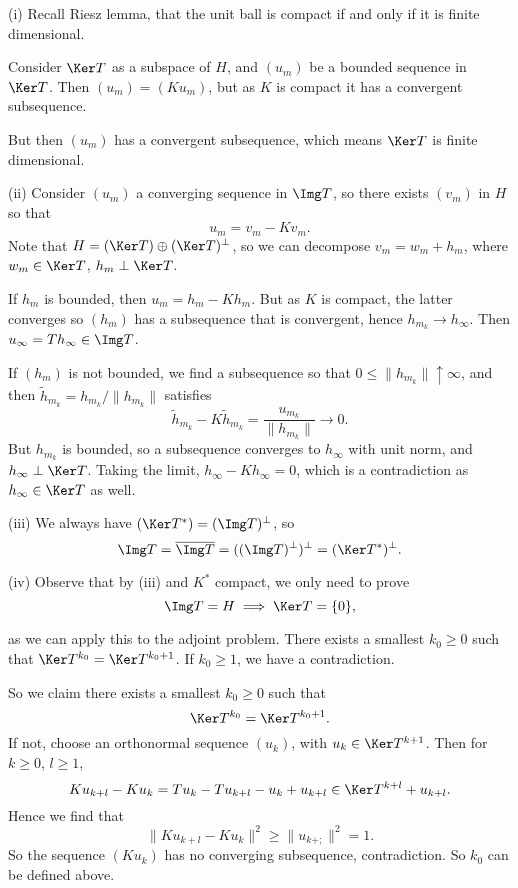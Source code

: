 \documentclass[12pt]{article}
\begin{document}
\begin{proofbox}
	
	
	(i) Recall Riesz lemma, that the unit ball is compact if and only if it is finite dimensional.

	Consider $\Ker T$ as a subspace of $H$, and $(u_m)$ be a bounded sequence in $\Ker T$. Then $(u_m) = (K u_m)$, but as $K$ is compact it has a convergent subsequence.

	But then $(u_m)$ has a convergent subsequence, which means $\Ker T$ is finite dimensional.

	(ii) Consider $(u_m)$ a converging sequence in $\Img T$, so there exists $(v_m)$ in $H$ so that
	\[
	u_m = v_m - K v_m.
	\]
	Note that $H = (\Ker T) \oplus (\Ker T)^{\perp}$, so we can decompose $v_m = w_m + h_m$, where $w_m \in \Ker T$, $h_m \perp \Ker T$.

	If $h_m$ is bounded, then $u_m = h_m - K h_m$. But as $K$ is compact, the latter converges so $(h_m)$ has a subsequence that is convergent, hence $h_{m_k} \to h_\infty$. Then $u_\infty = T h_\infty \in \Img T$.

	If $(h_m)$ is not bounded, we find a subsequence so that $0 \leq \|h_{m_k}\| \uparrow \infty$, and then $\tilde h_{m_k} = h_{m_k} / \|h_{m_k}\|$ satisfies
	\[
	\tilde h_{m_k} - K \tilde h_{m_k} = \frac{u_{m_k}}{ \|h_{m_k}\|} \to 0.
	\]
	But $h_{m_k}$ is bounded, so a subsequence converges to $h_\infty$ with unit norm, and $h_\infty \perp \Ker T$. Taking the limit, $h_\infty - K h_\infty = 0$, which is a contradiction as $h_\infty \in \Ker T$ as well.

	(iii) We always have $(\Ker T^{\ast}) = (\Img T)^{\perp}$, so
	\[
	\Img T = \overline{\Img T} = ((\Img T)^{\perp})^{\perp} = (\Ker T^{\ast})^{\perp}.
	\]

	(iv) Observe that by (iii) and $K^{\ast}$ compact, we only need to prove
	\[
		\Img T = H \implies \Ker T = \{0\},
	\]

	as we can apply this to the adjoint problem. There exists a smallest $k_0 \geq 0$ such that $\Ker T^{k_0} = \Ker T^{k_0 + 1}$. If $k_0 \geq 1$, we have a contradiction.

	So we claim there exists a smallest $k_0 \geq 0$ such that
	\[
	\Ker T^{k_0} = \Ker T^{k_0 + 1}.
	\]
	If not, choose an orthonormal sequence $(u_k)$, with $u_k \in \Ker T^{k+1}$. Then for $k \geq 0$, $l \geq 1$,
	\[
	K u_{k + l} - K u_k = T u_k - T u_{k+l} - u_k + u_{k+l} \in \Ker T^{k+l} + u_{k+l}.
	\]
	Hence we find that
	\[
	\|K u_{k+l} - K u_k\|^2 \geq \|u_{k+;}\|^2 = 1.
	\]
	So the sequence $(K u_k)$ has no converging subsequence, contradiction. So $k_0$ can be defined above.


\end{proofbox}
\end{document}
